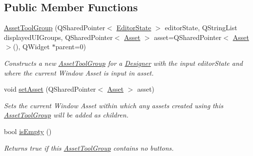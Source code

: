 \subsection*{Public Member Functions}
\begin{DoxyCompactItemize}
\item 
\hyperlink{class_asset_tool_group_a17d06fef61e3be02d9c9125f24bc72d1}{Asset\-Tool\-Group} (Q\-Shared\-Pointer$<$ \hyperlink{class_editor_state}{Editor\-State} $>$ editor\-State, Q\-String\-List displayed\-U\-I\-Groups, Q\-Shared\-Pointer$<$ \hyperlink{class_picto_1_1_asset}{Asset} $>$ asset=Q\-Shared\-Pointer$<$ \hyperlink{class_picto_1_1_asset}{Asset} $>$(), Q\-Widget $\ast$parent=0)
\begin{DoxyCompactList}\small\item\em Constructs a new \hyperlink{class_asset_tool_group}{Asset\-Tool\-Group} for a \hyperlink{class_designer}{Designer} with the input editor\-State and where the current Window Asset is input in asset. \end{DoxyCompactList}\item 
\hypertarget{class_asset_tool_group_a9a822c3d6a7777cf151d47d7ea606f46}{void \hyperlink{class_asset_tool_group_a9a822c3d6a7777cf151d47d7ea606f46}{set\-Asset} (Q\-Shared\-Pointer$<$ \hyperlink{class_picto_1_1_asset}{Asset} $>$ asset)}\label{class_asset_tool_group_a9a822c3d6a7777cf151d47d7ea606f46}

\begin{DoxyCompactList}\small\item\em Sets the current Window Asset within which any assets created using this \hyperlink{class_asset_tool_group}{Asset\-Tool\-Group} will be added as children. \end{DoxyCompactList}\item 
\hypertarget{class_asset_tool_group_a172ffbd18587796e3fbd93dde8d62ba5}{bool \hyperlink{class_asset_tool_group_a172ffbd18587796e3fbd93dde8d62ba5}{is\-Empty} ()}\label{class_asset_tool_group_a172ffbd18587796e3fbd93dde8d62ba5}

\begin{DoxyCompactList}\small\item\em Returns true if this \hyperlink{class_asset_tool_group}{Asset\-Tool\-Group} contains no buttons. \end{DoxyCompactList}\end{DoxyCompactItemize}
